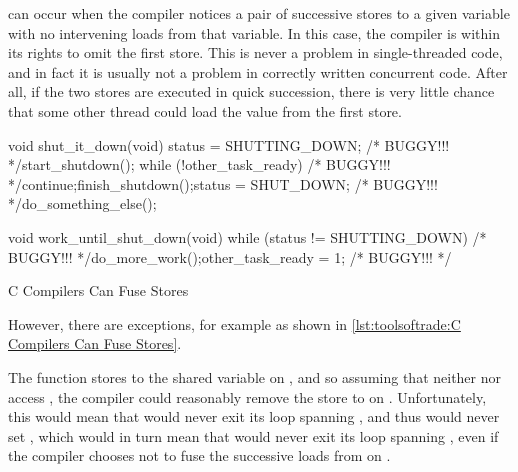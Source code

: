 \begin{description}[labelsep=.4em]
\item[Store fusing] can occur when the compiler notices a pair of successive
stores to a given variable with no intervening loads from that variable.
In this case, the compiler is within its rights to omit the first store.
This is never a problem in single-threaded code, and in fact it is
usually not a problem in correctly written concurrent code.
After all, if the two stores are executed in quick succession, there is
very little chance that some other thread could load the value from the
first store.

\begin{listing}
\begin{fcvlabel}
\begin{VerbatimLL}[commandchars=\\\[\]]
void shut_it_down(void)
{
	status = SHUTTING_DOWN; /* BUGGY!!! */\lnlbl[store:a]
	start_shutdown();
	while (!other_task_ready) /* BUGGY!!! */\lnlbl[loop:b]
		continue;\lnlbl[loop:e]
	finish_shutdown();\lnlbl[finish]
	status = SHUT_DOWN; /* BUGGY!!! */\lnlbl[store:b]
	do_something_else();
}

void work_until_shut_down(void)
{
	while (status != SHUTTING_DOWN) /* BUGGY!!! */
		do_more_work();
	other_task_ready = 1; /* BUGGY!!! */
}
\end{VerbatimLL}
\end{fcvlabel}
\caption{C Compilers Can Fuse Stores}
\label{lst:toolsoftrade:C Compilers Can Fuse Stores}
\end{listing}

However, there are exceptions, for example as shown in
\cref{lst:toolsoftrade:C Compilers Can Fuse Stores}.
\begin{fcvref}
The function  stores to the shared
variable  on ,
and so assuming that neither
 nor  access ,
the compiler could reasonably remove the store to  on
.
Unfortunately, this would mean that  would
never exit its loop spanning
, and thus would never set
, which would in turn mean that 
would never exit its loop spanning
, even if
the compiler chooses not to fuse the successive loads from
 on .


\end{fcvref}
\end{description}
